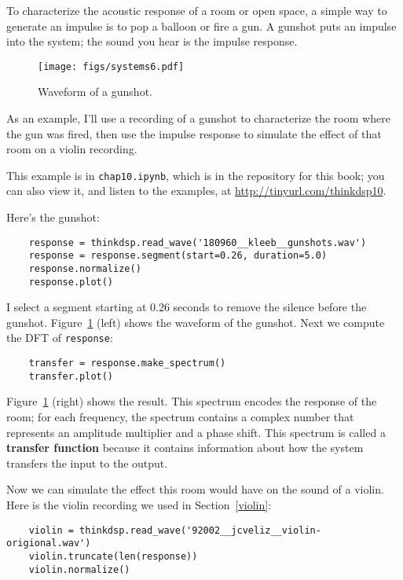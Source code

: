 To characterize the acoustic response of a room or open space, a
simple way to generate an impulse is to pop a balloon or
fire a gun.  A gunshot puts an impulse into
the system; the sound you hear is the impulse response.

\begin{figure}
	\centerline{\texttt{[image: figs/systems6.pdf]}}
	\caption{Waveform of a gunshot.}
	\label{fig.systems6}
\end{figure}

As an example, I'll use a recording of a gunshot to characterize
the room where the gun was fired, then use the impulse response
to simulate the effect of that room on a violin recording.

This example is in {\tt chap10.ipynb}, which is in the repository
for this book; you can also view it, and listen to the examples,
at \url{http://tinyurl.com/thinkdsp10}.

Here's the gunshot:

\begin{verbatim}
	response = thinkdsp.read_wave('180960__kleeb__gunshots.wav')
	response = response.segment(start=0.26, duration=5.0)
	response.normalize()
	response.plot()
\end{verbatim}

I select a segment starting at 0.26 seconds to remove the silence
before the gunshot.  Figure~\ref{fig.systems6} (left) shows the
waveform of the gunshot.  Next we compute the DFT of {\tt response}:

\begin{verbatim}
	transfer = response.make_spectrum()
	transfer.plot()
\end{verbatim}

Figure~\ref{fig.systems6} (right) shows the result.  This spectrum
encodes the response of the room; for each frequency, the spectrum
contains a complex number that represents an amplitude multiplier and
a phase shift.  This spectrum is called a {\bf transfer
	function} because it contains information about how the system transfers
the input to the output.

Now we can simulate the effect this room would have on the sound
of a violin.  Here is the violin recording we used in Section~\ref{violin}:

\begin{verbatim}
	violin = thinkdsp.read_wave('92002__jcveliz__violin-origional.wav')
	violin.truncate(len(response))
	violin.normalize()
\end{verbatim}

